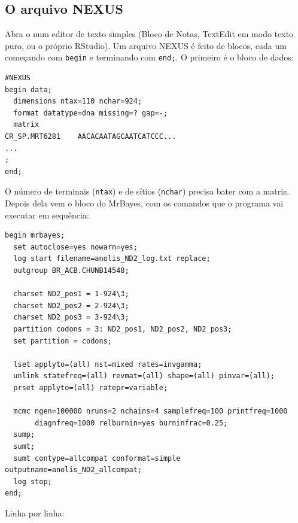\documentclass[11pt,a4paper]{article}
\newcommand{\arq}[1]{\path{#1}}
\newcommand{\cmd}[1]{\texttt{#1}}
\begin{document}
\subsection{O arquivo NEXUS}

Abra o \arq{anolis_ND2.nex} num editor de texto simples (Bloco de Notas, TextEdit em modo texto
puro, ou o próprio RStudio). Um arquivo NEXUS é feito de blocos, cada um começando com
\cmd{begin} e terminando com \cmd{end;}. O primeiro é o bloco de dados:
\begin{Verbatim}
#NEXUS
begin data;
  dimensions ntax=110 nchar=924;
  format datatype=dna missing=? gap=-;
  matrix
CR_SP.MRT6281    AACACAATAGCAATCATCCC...
...
;
end;
\end{Verbatim}
O número de terminais (\cmd{ntax}) e de sítios (\cmd{nchar}) precisa bater com a matriz. Depois
dela vem o bloco do MrBayes, com os comandos que o programa vai executar em sequência:
\begin{Verbatim}
begin mrbayes;
  set autoclose=yes nowarn=yes;
  log start filename=anolis_ND2_log.txt replace;
  outgroup BR_ACB.CHUNB14548;

  charset ND2_pos1 = 1-924\3;
  charset ND2_pos2 = 2-924\3;
  charset ND2_pos3 = 3-924\3;
  partition codons = 3: ND2_pos1, ND2_pos2, ND2_pos3;
  set partition = codons;

  lset applyto=(all) nst=mixed rates=invgamma;
  unlink statefreq=(all) revmat=(all) shape=(all) pinvar=(all);
  prset applyto=(all) ratepr=variable;

  mcmc ngen=100000 nruns=2 nchains=4 samplefreq=100 printfreq=1000
       diagnfreq=1000 relburnin=yes burninfrac=0.25;
  sump;
  sumt;
  sumt contype=allcompat conformat=simple outputname=anolis_ND2_allcompat;
  log stop;
end;
\end{Verbatim}
Linha por linha:
\end{document}
